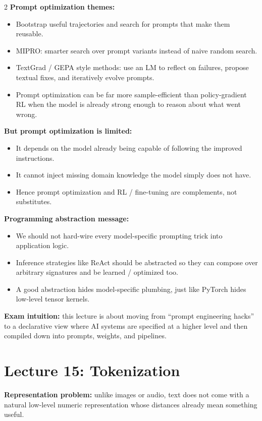 \documentclass[10pt]{article}
\begin{document}
\begin{multicols*}{2}
\textbf{Prompt optimization themes:}
\begin{itemize}
\item Bootstrap useful trajectories and search for prompts that make them reusable.
\item MIPRO: smarter search over prompt variants instead of naive random search.
\item TextGrad / GEPA style methods: use an LM to reflect on failures, propose textual fixes, and iteratively evolve prompts.
\item Prompt optimization can be far more sample-efficient than policy-gradient RL when the model is already strong enough to reason about what went wrong.
\end{itemize}

\textbf{But prompt optimization is limited:}
\begin{itemize}
\item It depends on the model already being capable of following the improved instructions.
\item It cannot inject missing domain knowledge the model simply does not have.
\item Hence prompt optimization and RL / fine-tuning are complements, not substitutes.
\end{itemize}

\textbf{Programming abstraction message:}
\begin{itemize}
\item We should not hard-wire every model-specific prompting trick into application logic.
\item Inference strategies like ReAct should be abstracted so they can compose over arbitrary signatures and be learned / optimized too.
\item A good abstraction hides model-specific plumbing, just like PyTorch hides low-level tensor kernels.
\end{itemize}

\textbf{Exam intuition:} this lecture is about moving from ``prompt engineering hacks'' to a declarative view where AI systems are specified at a higher level and then compiled down into prompts, weights, and pipelines.

\section*{Lecture 15: Tokenization}
\textbf{Representation problem:} unlike images or audio, text does not come with a natural low-level numeric representation whose distances already mean something useful.


\end{multicols*}
\end{document}
